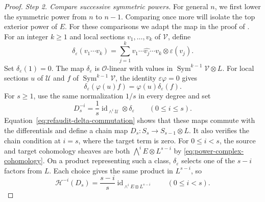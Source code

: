 \documentclass[12pt,reqno,a4paper]{amsart}
\numberwithin{equation}{section}
\numberwithin{figure}{section}
\theoremstyle{plain}
\theoremstyle{definition}
\begin{document}
\begin{proof}
\smallskip
\noindent\textit{Step 2. Compare successive symmetric powers.}
For general $n$, we first lower the symmetric power from $n$ to $n-1$.
Comparing once more will isolate the top exterior power of $E$.
For these comparisons we adapt the map in the proof of
\cite[Proposition~3.6]{RSWY}.
For an integer $k\geq1$ and local sections $v_1,\ldots,v_k$ of
$\mathcal V$, define
\[
 \delta_\varepsilon(v_1\cdots v_k)
  =\sum_{j=1}^k
       v_1\cdots\widehat{v_j}\cdots v_k\otimes\varepsilon(v_j).
\]
Set $\delta_\varepsilon(1)=0$. The map $\delta_\varepsilon$ is
$\mathcal O$-linear with values in
$\operatorname{Sym}^{k-1}\mathcal V\otimes L$.
For local sections $u$ of $\mathcal U$ and $f$ of
$\operatorname{Sym}^{k-1}\mathcal V$, the identity
$\varepsilon\varphi=0$ gives
\begin{equation}\label{eq:refaudit-delta-commutation}
 \delta_\varepsilon(\varphi(u)f)
 =\varphi(u)\delta_\varepsilon(f).
\end{equation}
For $s\geq1$, use the same normalization $1/s$ in every degree and set
\begin{equation}\label{eq:symmetric-comparison-map}
 D_s^{-i}=\frac1s\operatorname{id}_{\wedge^i\mathcal U}
                       \otimes\delta_\varepsilon
       \qquad(0\leq i\leq s).
\end{equation}
Equation~\eqref{eq:refaudit-delta-commutation} shows that these maps
commute with the differentials and define a chain map
$D_s:S_s\to S_{s-1}\otimes L$.
It also verifies the chain condition at $i=s$, where the target
term is zero. For $0\leq i<s$, the source and target cohomology
sheaves are both $\bigwedge^iE\otimes L^{s-i}$ by
\eqref{eq:power-complex-cohomology}. On a product representing such
a class, $\delta_\varepsilon$ selects one of the $s-i$ factors from
$L$. Each choice gives the same product in $L^{s-i}$, so
\begin{equation}\label{eq:symmetric-comparison-cohomology}
 \mathcal H^{-i}(D_s)
 =\frac{s-i}{s}\operatorname{id}_{\wedge^iE\otimes L^{s-i}}
       \qquad(0\leq i<s).
\end{equation}


\end{proof}
\end{document}
